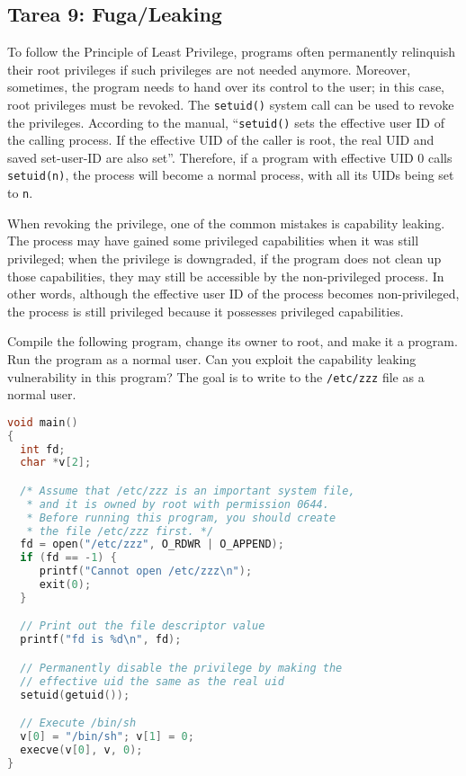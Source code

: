 \subsection{Tarea 9: Fuga/Leaking}

To follow the Principle of Least Privilege, \setuid programs often
permanently relinquish their root privileges if such privileges are not
needed anymore. Moreover, sometimes, the program needs to hand over its
control to the user; in this case, root privileges must be revoked.
The {\tt setuid()} system call can be used to revoke the privileges.
According to the manual, ``\texttt{setuid()} sets the effective user ID of
the calling process. If the effective UID of the caller is root, the real
UID and saved set-user-ID are also set''. Therefore, if a \setuid program
with effective UID 0 calls \texttt{setuid(n)}, the process will become a
normal process, with all its UIDs being set to \texttt{n}.

When revoking the privilege, one of the common mistakes is capability
leaking. The process may have gained some privileged capabilities when it
was still privileged; when the privilege is downgraded, if the program
does not clean up those capabilities, they may still be accessible by the
non-privileged process. In other words, although the effective user ID of
the process becomes non-privileged, the process is still privileged because
it possesses privileged capabilities.

Compile the following program, change its owner to root, and
make it a \setuid program. Run the program as a normal user.
Can you exploit the capability leaking vulnerability in this program?
The goal is to write to the {\tt /etc/zzz} file as a normal user.

\begin{lstlisting}[language=C, caption=\texttt{cap\_leak.c}]
void main()
{
  int fd;
  char *v[2];

  /* Assume that /etc/zzz is an important system file,
   * and it is owned by root with permission 0644.
   * Before running this program, you should create
   * the file /etc/zzz first. */
  fd = open("/etc/zzz", O_RDWR | O_APPEND);
  if (fd == -1) {
     printf("Cannot open /etc/zzz\n");
     exit(0);
  }

  // Print out the file descriptor value
  printf("fd is %d\n", fd);

  // Permanently disable the privilege by making the
  // effective uid the same as the real uid
  setuid(getuid());

  // Execute /bin/sh
  v[0] = "/bin/sh"; v[1] = 0;
  execve(v[0], v, 0);
}
\end{lstlisting}



